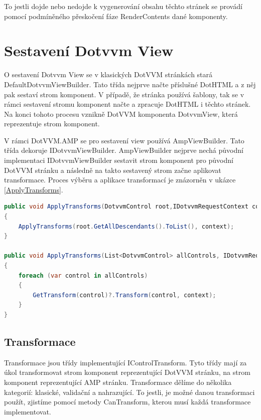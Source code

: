  To jestli dojde nebo nedojde k vygenerování obsahu těchto stránek se provádí pomocí podmíněného přeskočení fáze RenderContents dané komponenty.
 
\section{Sestavení Dotvvm View}
O sestavení Dotvvm View se v klasických DotVVM stránkách stará DefaultDotvvmViewBuilder. Tato třída nejprve načte příslušné DotHTML a z něj pak sestaví strom komponent. V případě, že stránka používá šablony, tak se v rámci sestavení stromu komponent načte a zpracuje DotHTML i těchto stránek. Na konci tohoto procesu vznikně DotVVM komponenta  DotvvmView, která reprezentuje strom komponent.

V rámci DotVVM.AMP se pro sestavení view používá AmpViewBuilder. Tato třída dekoruje IDotvvmViewBuilder. AmpViewBuilder nejprve nechá původní implementaci IDotvvmViewBuilder sestavit strom komponent pro původní DotVVM stránku a následně na takto sestavený strom začne aplikovat transformace. Proces výběru a aplikace transformací je znázorněn v ukázce \ref{ApplyTransforms}. 
\begin{lstlisting}[language=c#, caption= Ukázka aplikace transformací ,label=ApplyTransforms,captionpos=t]
public void ApplyTransforms(DotvvmControl root,IDotvvmRequestContext context)
{
    ApplyTransforms(root.GetAllDescendants().ToList(), context);
}

public void ApplyTransforms(List<DotvvmControl> allControls, IDotvvmRequestContext context)
{
    foreach (var control in allControls)
    {
        GetTransform(control)?.Transform(control, context);
    }
}
\end{lstlisting}
\subsection*{Transformace}
Transformace jsou třídy implementující IControlTransform. Tyto třídy mají za úkol transformovat strom komponent reprezentující DotVVM stránku, na strom komponent reprezentující AMP stránku. Transformace dělíme do několika kategorií: klasické, validační a nahrazující. To jestli, je možné danou transformaci použít, zjistíme pomocí metody CanTransform, kterou musí každá transformace implementovat.

